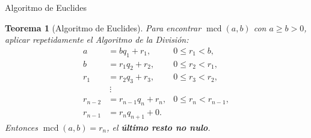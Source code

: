 \documentclass[10pt,aspectratio=169]{beamer}
\theoremstyle{definition}
\theoremstyle{plain}
\newtheorem{teorema}{Teorema}
\theoremstyle{remark}
\newcommand{\mcd}{\operatorname{mcd}}
\begin{document}
\begin{frame}{Algoritmo de Euclides}
  \begin{teorema}[Algoritmo de Euclides]
    Para encontrar $\mcd(a,b)$ con $a\ge b>0$, aplicar repetidamente el
    Algoritmo de la División:
    \[
      \begin{aligned}
        a &= b q_1 + r_1, & 0\le r_1 < b,\\
        b &= r_1 q_2 + r_2, & 0\le r_2 < r_1,\\
        r_1 &= r_2 q_3 + r_3, & 0\le r_3 < r_2,\\
        &\ \vdots\\
        r_{n-2} &= r_{n-1} q_n + r_n, & 0\le r_n < r_{n-1},\\
        r_{n-1} &= r_n q_{n+1} + 0.
      \end{aligned}
    \]
    Entonces $\mcd(a,b)=r_n$, el \textbf{último resto no nulo}.
  \end{teorema}
\end{frame}
\end{document}
